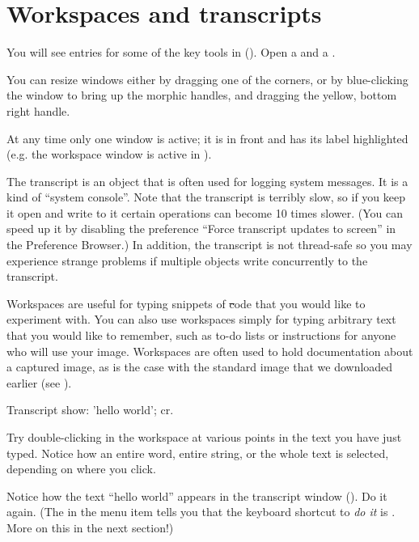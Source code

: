 \documentclass[a4paper,10pt,twoside]{book}
\begin{document}
\section{Workspaces and transcripts}
\label{sec:transcript}

You will see entries for some of the key tools in \sq ().
Open a  and a .

You can resize windows either by dragging one of the corners, or by blue-clicking the window to bring up the morphic handles, and dragging the yellow, bottom right handle.

At any time only one window is active; it is in front and has its label highlighted (e.g. the workspace window is active in ).

The transcript is an object that is often used for logging system messages.
It is a kind of ``system console''.
Note that the transcript is terribly slow, so if you keep it open and write to it certain operations can become 10 times slower.
(You can speed up it by disabling the preference ``Force transcript updates to screen'' in the Preference Browser.)
In addition, the transcript is not thread-safe so you may experience strange problems if multiple objects write concurrently to the transcript.

Workspaces are useful for typing snippets of \st code that you would like to experiment with.
You can also use workspaces simply for typing arbitrary text that you would like to remember, such as to-do lists or instructions for anyone who will use your image.
Workspaces are often used to hold documentation about a captured image, as is the case with the standard image that we downloaded earlier (see ).

\begin{code}{}
Transcript show: 'hello world'; cr.
\end{code}

Try double-clicking in the workspace at various points in the text you have just typed.
Notice how an entire word, entire string, or the whole text is selected, depending on where you click.

Notice how the text ``hello world'' appears in the transcript window
().
Do it again.
(The  in the menu item  tells you that the keyboard shortcut to \emph{do it} is .
More on this in the next section!)
\end{document}
